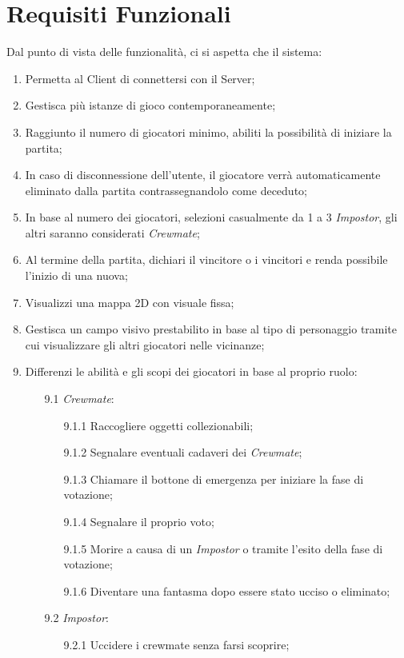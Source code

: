\section{Requisiti Funzionali}
Dal punto di vista delle funzionalit\`a, ci si aspetta che il sistema:
\begin{enumerate}
\item Permetta al Client di connettersi con il Server;
\item Gestisca pi\`u istanze di gioco contemporaneamente;
\item Raggiunto il numero di giocatori minimo, abiliti la possibilit\`a di iniziare la partita;
\item In caso di disconnessione dell’utente, il giocatore verr\`a automaticamente eliminato dalla partita contrassegnandolo come deceduto;
\item In base al numero dei giocatori, selezioni casualmente da 1 a 3 \textit{Impostor}, gli altri saranno considerati \textit{Crewmate};
\item Al termine della partita, dichiari il vincitore o i vincitori e renda possibile l'inizio di una nuova;
\item Visualizzi una mappa 2D con visuale fissa;
\item Gestisca un campo visivo prestabilito in base al tipo di personaggio tramite cui visualizzare gli altri giocatori nelle vicinanze;
\item Differenzi le abilit\`a e gli scopi dei giocatori in base al proprio ruolo:
\begin{enumerate}
\item[9.1] \textit{Crewmate}:
\begin{enumerate}
\item[9.1.1] Raccogliere oggetti collezionabili;
\item[9.1.2] Segnalare eventuali cadaveri dei \textit{Crewmate};
\item[9.1.3] Chiamare il bottone di emergenza per iniziare la fase di votazione;
\item[9.1.4] Segnalare il proprio voto;
\item[9.1.5] Morire a causa di un \textit{Impostor} o tramite l'esito della fase di votazione;
\item[9.1.6] Diventare una fantasma dopo essere stato ucciso o eliminato;
\end{enumerate}
\item[9.2] \textit{Impostor}:
\begin{enumerate}
\item[9.2.1] Uccidere i crewmate senza farsi scoprire;

\end{enumerate}
\end{enumerate}
\end{enumerate}
